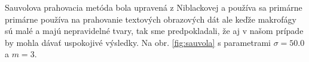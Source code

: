 \documentclass[a4paper,11pt,oneside]{article}%
\begin{document}
Sauvolova prahovacia metóda bola upravená z Niblackovej a používa sa primárne primárne používa na prahovanie textových obrazových dát ale keďže makrofágy sú malé a majú nepravidelné tvary, tak sme predpokladali, že aj v našom prípade by mohla dávať uspokojivé výsledky. Na obr. \ref{fig:sauvola} s parametrami $\sigma = 50.0$ a $m = 3$.

\begin{figure}[H]  
    \hspace{5px}

\end{figure}
\end{document}
